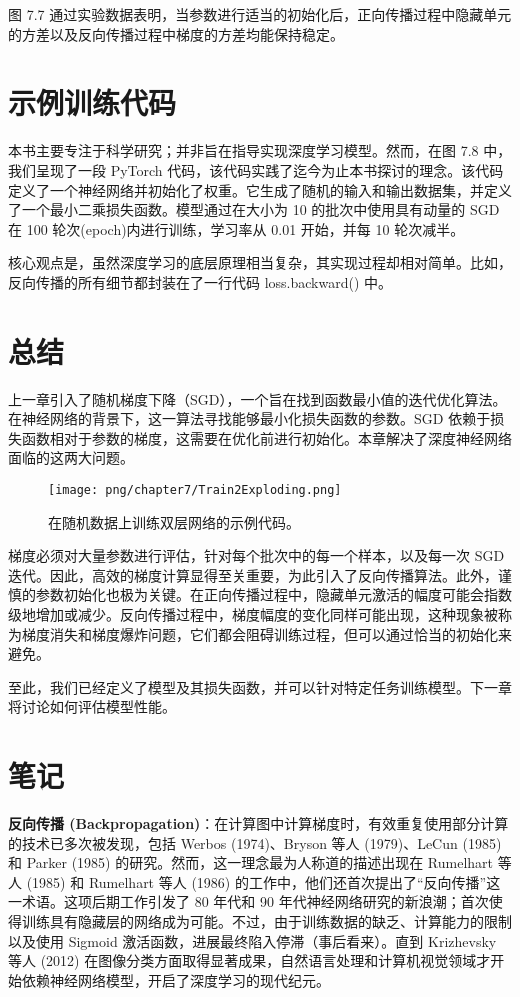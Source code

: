 图 7.7 通过实验数据表明，当参数进行适当的初始化后，正向传播过程中隐藏单元的方差以及反向传播过程中梯度的方差均能保持稳定。

\section{示例训练代码}
本书主要专注于科学研究；并非旨在指导实现深度学习模型。然而，在图 7.8 中，我们呈现了一段 PyTorch 代码，该代码实践了迄今为止本书探讨的理念。该代码定义了一个神经网络并初始化了权重。它生成了随机的输入和输出数据集，并定义了一个最小二乘损失函数。模型通过在大小为 10 的批次中使用具有动量的 SGD 在 100 轮次(epoch)内进行训练，学习率从 0.01 开始，并每 10 轮次减半。

核心观点是，虽然深度学习的底层原理相当复杂，其实现过程却相对简单。比如，反向传播的所有细节都封装在了一行代码 loss.backward()  中。

\section{总结}
上一章引入了随机梯度下降（SGD），一个旨在找到函数最小值的迭代优化算法。在神经网络的背景下，这一算法寻找能够最小化损失函数的参数。SGD 依赖于损失函数相对于参数的梯度，这需要在优化前进行初始化。本章解决了深度神经网络面临的这两大问题。

\begin{figure}[ht!]
\centering
\texttt{[image: png/chapter7/Train2Exploding.png]}
\caption{在随机数据上训练双层网络的示例代码。}
\end{figure}

梯度必须对大量参数进行评估，针对每个批次中的每一个样本，以及每一次 SGD 迭代。因此，高效的梯度计算显得至关重要，为此引入了反向传播算法。此外，谨慎的参数初始化也极为关键。在正向传播过程中，隐藏单元激活的幅度可能会指数级地增加或减少。反向传播过程中，梯度幅度的变化同样可能出现，这种现象被称为梯度消失和梯度爆炸问题，它们都会阻碍训练过程，但可以通过恰当的初始化来避免。

至此，我们已经定义了模型及其损失函数，并可以针对特定任务训练模型。下一章将讨论如何评估模型性能。
\section{笔记}
\textbf{反向传播 (Backpropagation)}：在计算图中计算梯度时，有效重复使用部分计算的技术已多次被发现，包括 Werbos (1974)、Bryson 等人 (1979)、LeCun (1985) 和 Parker (1985) 的研究。然而，这一理念最为人称道的描述出现在 Rumelhart 等人 (1985) 和 Rumelhart 等人 (1986) 的工作中，他们还首次提出了“反向传播”这一术语。这项后期工作引发了 80 年代和 90 年代神经网络研究的新浪潮；首次使得训练具有隐藏层的网络成为可能。不过，由于训练数据的缺乏、计算能力的限制以及使用 Sigmoid 激活函数，进展最终陷入停滞（事后看来）。直到 Krizhevsky 等人 (2012) 在图像分类方面取得显著成果，自然语言处理和计算机视觉领域才开始依赖神经网络模型，开启了深度学习的现代纪元。

